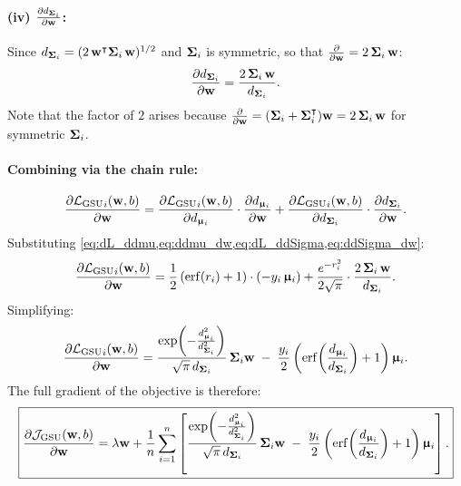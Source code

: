 \documentclass[11pt, letterpaper]{article}
\newcommand{\bSigma}{\vb{\Sigma}}
\newcommand{\bmu}{\boldsymbol{\upmu}}
\newcommand{\loss}{\mathcal{L}}
\newcommand{\obj}{\mathcal{J}}
\begin{document}
\paragraph{(iv) $\pdv{d_{\bSigma_i}}{\vb{w}}$:} Since $d_{\bSigma_i} = (2\, \vb{w}^{\intercal} \bSigma_i\, \vb{w})^{1/2}$ and $\bSigma_i$ is symmetric, so that $\pdv{}{\vb{w}}(\vb{w}^{\intercal} \bSigma_i\, \vb{w}) = 2\,\bSigma_i\,\vb{w}$:
\begin{equation}\label{eq:ddSigma_dw}
    \pdv{d_{\bSigma_i}}{\vb{w}} = \frac{2\,\bSigma_i\,\vb{w}}{d_{\bSigma_i}}.
\end{equation}
Note that the factor of $2$ arises because $\pdv{}{\vb{w}}(\vb{w}^{\intercal} \bSigma_i\, \vb{w}) = (\bSigma_i + \bSigma_i^{\intercal})\vb{w} = 2\,\bSigma_i\,\vb{w}$ for symmetric $\bSigma_i$.

\paragraph{Combining via the chain rule:}
\begin{equation}
    \pdv{{\loss_{\text{GSU}}}_{i}(\vb{w}, b)}{\vb{w}} = \pdv{{\loss_{\text{GSU}}}_{i}(\vb{w}, b)}{d_{\bmu_i}} \cdot \pdv{d_{\bmu_i}}{\vb{w}} + \pdv{{\loss_{\text{GSU}}}_{i}(\vb{w}, b)}{d_{\bSigma_i}} \cdot \pdv{d_{\bSigma_i}}{\vb{w}}.
\end{equation}
Substituting \cref{eq:dL_ddmu,eq:ddmu_dw,eq:dL_ddSigma,eq:ddSigma_dw}:
\begin{equation}
    \pdv{{\loss_{\text{GSU}}}_{i}(\vb{w}, b)}{\vb{w}} = \frac{1}{2}\left(\mathrm{erf}(r_i)+1\right)\cdot(-y_i\,\bmu_i) + \frac{e^{-r_i^2}}{2\sqrt{\pi}} \cdot \frac{2\,\bSigma_i\,\vb{w}}{d_{\bSigma_i}}.
\end{equation}
Simplifying:
\begin{equation}
    \pdv{{\loss_{\text{GSU}}}_{i}(\vb{w}, b)}{\vb{w}} = \frac{\exp\!\left(-\frac{d_{\bmu_i}^2}{d_{\bSigma_i}^2}\right)}{\sqrt{\pi}\, d_{\bSigma_i}}\, \bSigma_i \vb{w} \;-\; \frac{y_i}{2}\left(\mathrm{erf}\!\left(\frac{d_{\bmu_i}}{d_{\bSigma_i}}\right) + 1\right) \bmu_i.
\end{equation}
The full gradient of the objective is therefore:
\begin{equation}\label{eq:gsu_grad_w}%
    \boxed{\pdv{\obj_{\text{GSU}} (\vb{w}, b)}{\vb{w}} = \lambda \vb{w} + \frac{1}{n}\sum_{i=1}^{n}\left[\frac{\exp\!\left(-\frac{d_{\bmu_i}^2}{d_{\bSigma_i}^2}\right)}{\sqrt{\pi}\, d_{\bSigma_i}}\, \bSigma_i \vb{w} \;-\; \frac{y_i}{2}\left(\mathrm{erf}\!\left(\frac{d_{\bmu_i}}{d_{\bSigma_i}}\right) + 1\right) \bmu_i\right].}
\end{equation}
\end{document}
